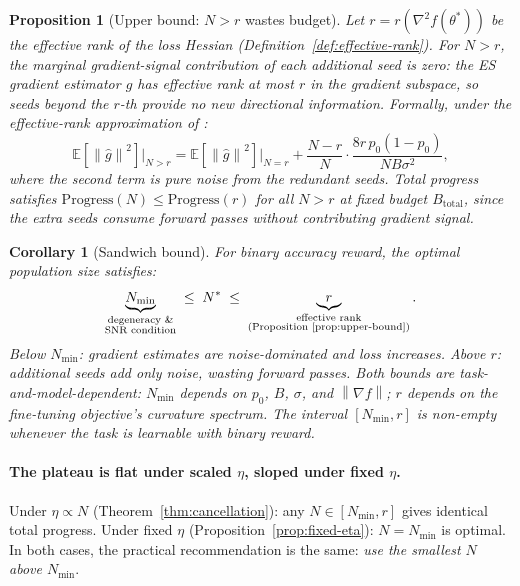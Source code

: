 \documentclass[11pt]{article}
\newtheorem{proposition}{Proposition}
\newtheorem{corollary}{Corollary}
\theoremstyle{definition}
\theoremstyle{remark}
\newcommand{\E}{\mathbb{E}}
\newcommand{\norm}[1]{\left\|#1\right\|}
\newcommand{\Nmin}{N_{\mathrm{min}}}
\begin{document}
\begin{proposition}[Upper bound: $N > r$ wastes budget]
\label{prop:upper-bound}
Let $r = r(\nabla^2 f(\theta^*))$ be the effective rank of the loss Hessian (Definition~\ref{def:effective-rank}). For $N > r$, the marginal gradient-signal contribution of each additional seed is zero: the ES gradient estimator $\hat{g}$ has effective rank at most $r$ in the gradient subspace, so seeds beyond the $r$-th provide no new directional information. Formally, under the effective-rank approximation of \citet{liang2026blessing}:
\begin{equation}
  \E\!\left[\norm{\hat{g}}^2\right]\big|_{N > r} = \E\!\left[\norm{\hat{g}}^2\right]\big|_{N = r} + \frac{N - r}{N}\cdot\frac{8r\,p_0(1-p_0)}{NB\sigma^2},
\end{equation}
where the second term is pure noise from the redundant seeds. Total progress satisfies $\mathrm{Progress}(N) \leq \mathrm{Progress}(r)$ for all $N > r$ at fixed budget $B_{\mathrm{total}}$, since the extra seeds consume forward passes without contributing gradient signal.
\end{proposition}

\begin{corollary}[Sandwich bound]
\label{cor:sandwich}
For binary accuracy reward, the optimal population size satisfies:
\begin{equation}
  \underbrace{\Nmin}_{\substack{\text{degeneracy \&} \\ \text{SNR condition}}} \;\leq\; N^* \;\leq\; \underbrace{r}_{\substack{\text{effective rank} \\ \text{(Proposition~\ref{prop:upper-bound})}}}.
  \label{eq:sandwich}
\end{equation}
Below $\Nmin$: gradient estimates are noise-dominated and loss increases. Above $r$: additional seeds add only noise, wasting forward passes. Both bounds are task-and-model-dependent: $\Nmin$ depends on $p_0$, $B$, $\sigma$, and $\norm{\nabla f}$; $r$ depends on the fine-tuning objective's curvature spectrum. The interval $[\Nmin, r]$ is non-empty whenever the task is learnable with binary reward.
\end{corollary}

\paragraph{The plateau is flat under scaled $\eta$, sloped under fixed $\eta$.}
Under $\eta \propto N$ (Theorem~\ref{thm:cancellation}): any $N \in [\Nmin, r]$ gives identical total progress. Under fixed $\eta$ (Proposition~\ref{prop:fixed-eta}): $N = \Nmin$ is optimal. In both cases, the practical recommendation is the same: \emph{use the smallest $N$ above $\Nmin$}.
\end{document}
